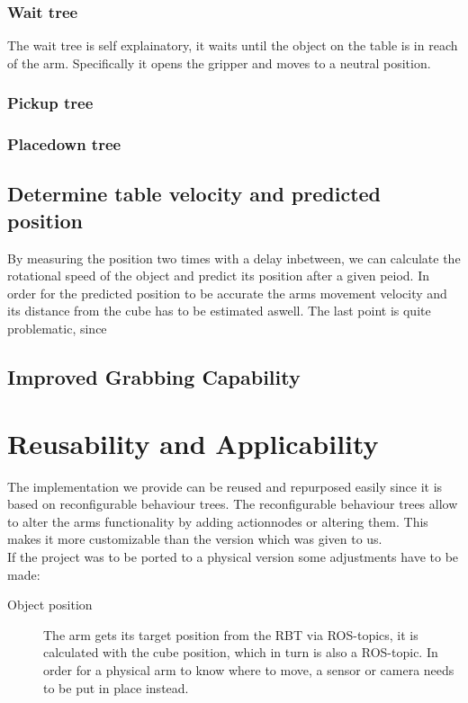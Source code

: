 \documentclass[report]{iisthesis}
\begin{document}
\subsection{Wait tree}
The wait tree is self explainatory, it waits until the object on the table is in reach of the arm.
Specifically it opens the gripper and moves to a neutral position.

\subsection{Pickup tree}

\subsection{Placedown tree}

\section{Determine table velocity and predicted position}
By measuring the position two times with a delay inbetween, we can calculate the rotational speed of the object and predict its position after a given peiod.
In order for the predicted position to be accurate the arms movement velocity and its distance from the cube has to be estimated aswell.
The last point is quite problematic, since 

\section{Improved Grabbing Capability}

\chapter{Reusability and Applicability}
The implementation we provide can be reused and repurposed easily since it is based on reconfigurable behaviour trees. The reconfigurable behaviour trees allow to alter the arms functionality
by adding actionnodes or altering them. This makes it more customizable than the version which was given to us. \\
If the project was to be ported to a physical version some adjustments have to be made:
\begin{description}
    \item[Object position] The arm gets its target position from the RBT via ROS-topics, it is calculated with the cube position, which in turn is also a ROS-topic. In order for a physical arm to know where to move, a sensor or camera needs to be put in place instead. 
    \item[] 
\end{description} 



\end{document}
